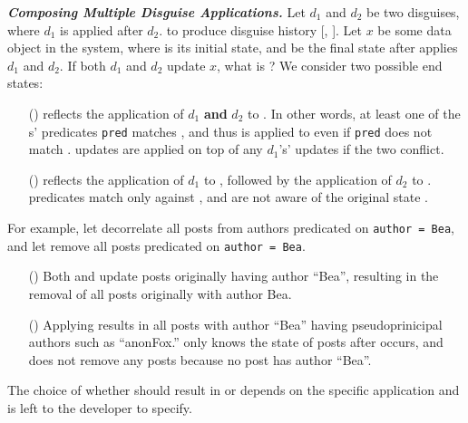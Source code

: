 \vspace{6pt}\noindent\textbf{\emph{Composing Multiple Disguise Applications.}}
Let $d_1$ and $d_2$ be two disguises, where $d_1$ is applied after $d_2$.
to produce disguise history [, ]. 
%
Let $x$ be some data object in the system, where \xstart is its initial state, and
 be the final state after \sys applies $d_1$ and $d_2$.
%
If both $d_1$ and $d_2$ update $x$, what is ?
We consider two possible end states: 
%
\begin{enumerate}
\item[(\appcompone)]  reflects the application of $d_1$ \textbf{and} $d_2$ to \xstart. In other
words, at least one of the s' predicates \texttt{pred} matches \xstart, and thus  is
applied to \xhist[\app{d_1}] even if \texttt{pred} does not match \xhist[\app{d_1}]. 
 updates are applied on top of any $d_1$'s' updates if the two conflict.

\item[(\appcomptwo)]  reflects the application of $d_1$ to \xstart, followed
by the application of $d_2$ to \xhist{[\app{d_1}]}.  predicates match only against
\xhist{[\app{d_1}]}, and are not aware of the original state \xstart.
\end{enumerate}

\noindent
For example, let  decorrelate all posts from authors predicated
on \texttt{author = Bea}, and let  remove all posts predicated on \texttt{author = Bea}.
%
\begin{enumerate}
\item[(\appcompone)] Both  and  update posts originally having author ``Bea'', resulting in the
removal of all posts originally with author Bea.

\item[(\appcomptwo)] Applying  results in all posts with author ``Bea'' having
pseudoprinicipal authors such as ``anonFox.''  only knows the state of posts after
 occurs, and does not remove any posts because no post has author ``Bea''.
\end{enumerate}

The choice of whether  should result in \appcompone or \appcomptwo depends on the
specific application and is left to the developer to specify. 

